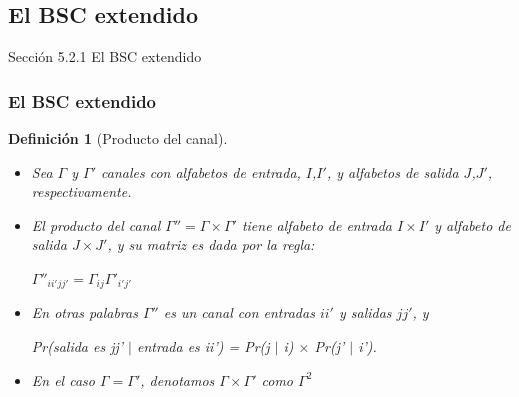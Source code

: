 \documentclass{beamer}
\theoremstyle{plain}
\newtheorem{definicion} [Definicion]{Definición}
\theoremstyle{example}
\theoremstyle{example}
\begin{document}
\subsection{El BSC extendido} \label{sec:BSC}

\begin{frame}   \footnotesize
{
\begin{block}{Sección 5.2.1}
El BSC extendido
\end{block}
}
\end{frame} 
\begin{frame}  \frametitle{El BSC extendido}\small  

\begin{definicion} [Producto del canal]

\begin{itemize}
\item Sea $\Gamma$ y $\Gamma'$ canales con alfabetos de entrada, $I$,$I'$, y alfabetos de salida $J$,$J'$, respectivamente. 

\item El producto del canal $\Gamma'' = \Gamma \times \Gamma'$ tiene alfabeto de entrada $I \times I'$ y alfabeto de salida $J \times J'$, y su matriz es dada por la regla:

\begin{center}
$\Gamma''_{ii'jj'} = \Gamma_{ij} \Gamma'_{i'j'}$
\end{center}

\item En otras palabras $\Gamma''$ es un canal con entradas $ii'$ y salidas $jj'$, y 

\begin{center}
Pr(salida es jj' $|$ entrada es ii') = Pr(j $|$ i) $\times$ Pr(j' $|$ i'). 
\end{center}

\item  En el caso $\Gamma = \Gamma'$, denotamos $\Gamma \times \Gamma'$ como $\Gamma^{2}$ 

\end{itemize}

\end{definicion}

\end{frame} 
\end{document}

